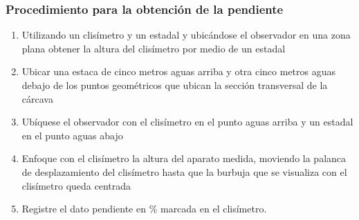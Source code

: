     \subsubsection{Procedimiento para la obtención de la pendiente}
    \begin{enumerate}
        \item Utilizando un clisímetro y un estadal y ubicándose el observador en una zona plana obtener la altura del clisímetro por medio de un estadal
        \item Ubicar una estaca de cinco metros aguas arriba y otra cinco metros aguas debajo de los puntos geométricos que ubican la sección transversal de la cárcava
        \item Ubíquese el observador con el clisímetro en el punto aguas arriba y un estadal en el punto aguas abajo
        \item Enfoque con el clisímetro la altura del aparato medida, moviendo la palanca de desplazamiento del clisímetro hasta que la burbuja que se visualiza con el clisímetro queda centrada
        \item Registre el dato pendiente en \% marcada en el clisímetro.
    \end{enumerate}
    
